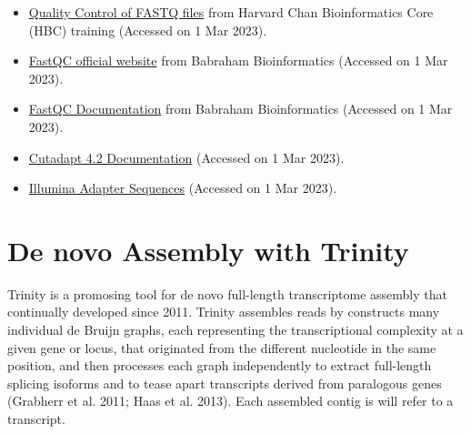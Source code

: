 \documentclass[
  letterpaper,
  DIV=11,
  numbers=noendperiod]{scrreprt}
\begin{document}
\begin{itemize}
\item
  \href{https://hbctraining.github.io/Intro-to-rnaseq-hpc-O2/lessons/02_assessing_quality.html}{Quality
  Control of FASTQ files} from Harvard Chan Bioinformatics Core (HBC)
  training (Accessed on 1 Mar 2023).
\item
  \href{https://www.bioinformatics.babraham.ac.uk/projects/fastqc/}{FastQC
  official website} from Babraham Bioinformatics (Accessed on 1 Mar
  2023).
\item
  \href{https://www.bioinformatics.babraham.ac.uk/projects/fastqc/Help/}{FastQC
  Documentation} from Babraham Bioinformatics (Accessed on 1 Mar 2023).
\item
  \href{https://cutadapt.readthedocs.io/en/stable/guide.html}{Cutadapt
  4.2 Documentation} (Accessed on 1 Mar 2023).
\item
  \href{https://support.illumina.com/downloads/illumina-adapter-sequences-document-1000000002694.html}{Illumina
  Adapter Sequences} (Accessed on 1 Mar 2023).
\end{itemize}


\hypertarget{de-novo-assembly-with-trinity}{%
\chapter{De novo Assembly with
Trinity}\label{de-novo-assembly-with-trinity}}

Trinity is a promosing tool for de novo full-length transcriptome
assembly that continually developed since 2011. Trinity assembles reads
by constructs many individual de Bruijn graphs, each representing the
transcriptional complexity at a given gene or locus, that originated
from the different nucleotide in the same position, and then processes
each graph independently to extract full-length splicing isoforms and to
tease apart transcripts derived from paralogous genes (Grabherr et al.
2011; Haas et al. 2013). Each assembled contig is will refer to a
transcript.
\end{document}

